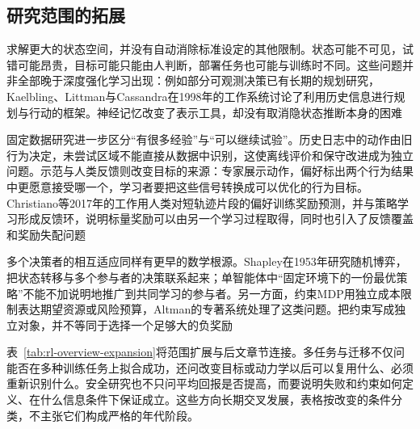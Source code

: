 \subsection{研究范围的拓展}
\label{sec:rl-overview-expansion}

求解更大的状态空间，并没有自动消除标准设定的其他限制。状态可能不可见，试错可能昂贵，目标可能只能由人判断，部署任务也可能与训练时不同。这些问题并非全部晚于深度强化学习出现：例如部分可观测决策已有长期的规划研究，Kaelbling、Littman与Cassandra在1998年的工作系统讨论了利用历史信息进行规划与行动的框架。神经记忆改变了表示工具，却没有取消隐状态推断本身的困难

固定数据研究进一步区分“有很多经验”与“可以继续试验”。历史日志中的动作由旧行为决定，未尝试区域不能直接从数据中识别，这使离线评价和保守改进成为独立问题。示范与人类反馈则改变目标的来源：专家展示动作，偏好标出两个行为结果中更愿意接受哪一个，学习者要把这些信号转换成可以优化的行为目标。Christiano等2017年的工作用人类对短轨迹片段的偏好训练奖励预测，并与策略学习形成反馈环，说明标量奖励可以由另一个学习过程取得，同时也引入了反馈覆盖和奖励失配问题

多个决策者的相互适应同样有更早的数学根源。Shapley在1953年研究随机博弈，把状态转移与多个参与者的决策联系起来；单智能体中“固定环境下的一份最优策略”不能不加说明地推广到共同学习的参与者。另一方面，约束MDP用独立成本限制表达期望资源或风险预算，Altman的专著系统处理了这类问题。把约束写成独立对象，并不等同于选择一个足够大的负奖励

表~\ref{tab:rl-overview-expansion}将范围扩展与后文章节连接。多任务与迁移不仅问能否在多种训练任务上拟合成功，还问改变目标或动力学以后可以复用什么、必须重新识别什么。安全研究也不只问平均回报是否提高，而要说明失败和约束如何定义、在什么信息条件下保证成立。这些方向长期交叉发展，表格按改变的条件分类，不主张它们构成严格的年代阶段。

